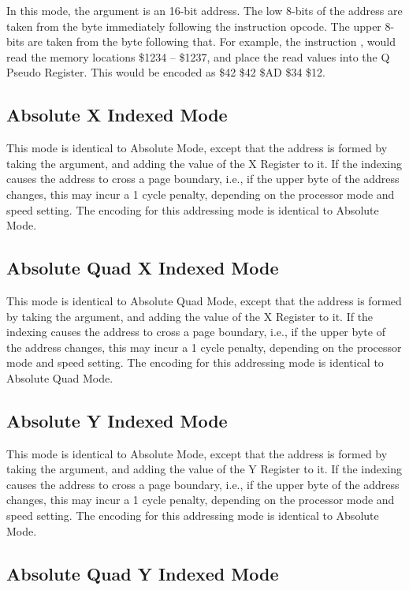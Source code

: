 In this mode, the argument is an 16-bit address.  The low 8-bits of the address are taken from
the byte immediately following the instruction opcode. The upper 8-bits are taken from the
byte following that.  For example, the instruction , would read the
memory locations \$1234 -- \$1237, and place the read values into the Q Pseudo Register.  This would
be encoded as \$42 \$42 \$AD \$34 \$12.

\subsection{Absolute X Indexed Mode}

This mode is identical to Absolute Mode, except that the address is formed by taking the
argument, and adding the value of the X Register to it.  If the indexing causes the address
to cross a page boundary, i.e., if the upper byte of the address changes, this may incur a
1 cycle penalty, depending on the processor mode and speed setting.
The encoding for this addressing mode is identical to Absolute Mode.

\subsection{Absolute Quad X Indexed Mode}

This mode is identical to Absolute Quad Mode, except that the address is formed by taking the
argument, and adding the value of the X Register to it.  If the indexing causes the address
to cross a page boundary, i.e., if the upper byte of the address changes, this may incur a
1 cycle penalty, depending on the processor mode and speed setting.
The encoding for this addressing mode is identical to Absolute Quad Mode.

\subsection{Absolute Y Indexed Mode}

This mode is identical to Absolute Mode, except that the address is formed by taking the
argument, and adding the value of the Y Register to it.  If the indexing causes the address
to cross a page boundary, i.e., if the upper byte of the address changes, this may incur a
1 cycle penalty, depending on the processor mode and speed setting.
The encoding for this addressing mode is identical to Absolute Mode.

\subsection{Absolute Quad Y Indexed Mode}

